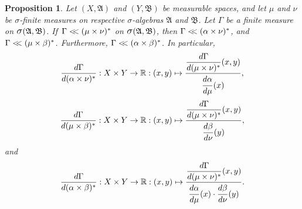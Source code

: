 \documentclass[
twoside=true,
paper=letter,
fontsize=11pt,
pagesize=auto,
leqno,
openany,
headsepline,
overfullrule,
]{scrbook}
\theoremstyle{plain}
\theoremstyle{plain}
\newtheorem{prop}[thm]{Proposition}
\theoremstyle{definition}
\theoremstyle{bfnoteitalic}
\theoremstyle{bfnoteroman}
\newcommand{\sigalg}[1]{\mathfrak{#1}}
\newcommand{\sagb}{\mathop{\hbox{\large{$\sigma$}}}\nolimits}
\newcommand{\textsigma}{\hbox{\large{$\sigma$}}\kern-1pt}
\newcommand{\R}{\mathbb{R}}
\newcommand{\sigmaalgebra}{\sigalg{A}}
\newcommand{\sigmaalgebraii}{\sigalg{B}}
\newcommand{\productsig}[2]{\sagb(#1,#2)}
\newcommand{\lilstrut}{\vphantom{\bigl(}}
\newcommand{\measurespace}{X}
\newcommand{\measurespaceii}{Y}
\newcommand{\mspaceelt}{x}
\newcommand{\mspaceeltii}{y}
\newcommand{\abscont}{\mathrel{< \kern-3.5pt <}}
\newcommand{\measure}{\mu}
\newcommand{\measmu}{\mu}
\newcommand{\measureii}{\nu}
\newcommand{\measnu}{\nu}
\newcommand{\joint}{\Gamma}%
\newcommand{\measonprod}{\Gamma}%
\newcommand{\marginalone}{\alpha}%
\newcommand{\marginaltwo}{\beta}%
\begin{document}
\begin{prop}\label{joint_abscont}
Let 
$(\measurespace, \sigmaalgebra)$
and
$(\measurespaceii, \sigmaalgebraii)$
be measurable spaces, and let $\measure$ and $\measureii$
be \textsigma-finite measures on  respective \textsigma-algebras
$\sigmaalgebra$ and $\sigmaalgebraii$.
Let $\measonprod$ be a finite measure on 
$\productsig{\sigmaalgebra}{\sigmaalgebraii}$.
If\,
$\measonprod \abscont (\measure\times\measureii)^*$
on
$\productsig{\sigmaalgebra}{\sigmaalgebraii}$,
then 
$\measonprod \abscont (\marginalone\times\measureii)^*$,
and
$\measonprod \abscont (\measure\times\marginaltwo)^*$.
Furthermore,
$\measonprod \abscont (\marginalone\times\marginaltwo)^*$.
In particular,
\[
\frac{d\measonprod}{d(\marginalone\times\measnu)^*}
: \measurespace\times\measurespaceii
\to \R
: (\mspaceelt,\mspaceeltii)\mapsto
\frac{\dfrac{d\joint}{d(\measmu\times\measnu)^*}
(\mspaceelt,\mspaceeltii)}
{\dfrac{d\marginalone\lilstrut}{d\measmu}(\mspaceelt)},
\]
\[
\frac{d\measonprod}{d(\measmu\times\marginaltwo)^*}
: \measurespace\times\measurespaceii
\to \R
: (\mspaceelt,\mspaceeltii)\mapsto
\frac{\dfrac{d\joint}{d(\measmu\times\measnu)^*}
(\mspaceelt,\mspaceeltii)}
{\dfrac{d\marginaltwo\lilstrut}{d\measnu}(\mspaceeltii)},
\]
and
\[
\frac{d\measonprod}{d(\marginalone\times\marginaltwo)^*}
: \measurespace\times\measurespaceii
\to \R
: (\mspaceelt,\mspaceeltii)\mapsto
\frac{\dfrac{d\joint}{d(\measmu\times\measnu)^*}
(\mspaceelt,\mspaceeltii)}
{\dfrac{d\marginalone\lilstrut}{d\measmu}(\mspaceelt)
\cdot
\dfrac{d\marginaltwo\lilstrut}{d\measnu}(\mspaceeltii)}.
\]
\end{prop}
\end{document}
